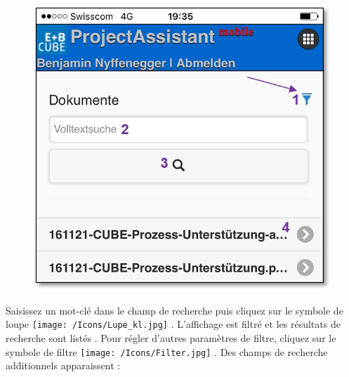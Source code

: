 \begin{figure}   %
  \vspace{-35pt}      %
  \begin{center}
    \includegraphics[width=1\linewidth]{../chapters/11_Dokumentenablage/pictures/11-mob04_Dokumentenuebersicht.jpg}
  \end{center}
  \vspace{-20pt}
  \vspace{-10pt}
\end{figure}

Saisissez un mot-clé dans le champ de recherche  puis cliquez sur le symbole de loupe \texttt{[image: /Icons/Lupe\_kl.jpg]} . L'affichage est filtré et les résultats de recherche sont listés . Pour régler d'autres paramètres de filtre, cliquez sur le symbole de filtre \texttt{[image: /Icons/Filter.jpg]} . Des champs de recherche additionnels apparaissent :

\vspace{3.5cm}

